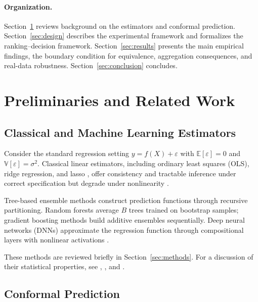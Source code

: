 \documentclass[pdflatex,sn-mathphys-ay]{sn-jnl}%
\theoremstyle{thmstyleone}%
\theoremstyle{thmstyletwo}%
\theoremstyle{thmstylethree}%
\begin{document}
\paragraph{Organization.}
Section~\ref{sec:prelim} reviews background on the estimators and conformal prediction. Section~\ref{sec:design} describes the experimental framework and formalizes the ranking--decision framework. Section~\ref{sec:results} presents the main empirical findings, the boundary condition for equivalence, aggregation consequences, and real-data robustness. Section~\ref{sec:conclusion} concludes.

\section{Preliminaries and Related Work}
\label{sec:prelim}

\subsection{Classical and Machine Learning Estimators}

Consider the standard regression setting $y = f(X) + \varepsilon$ with $\mathbb{E}[\varepsilon] = 0$ and $\mathbb{V}[\varepsilon] = \sigma^2$. Classical linear estimators, including ordinary least squares (OLS), ridge regression, and lasso \citep{tibshirani1996}, offer consistency and tractable inference under correct specification but degrade under nonlinearity \citep{lehmann2006}.

Tree-based ensemble methods construct prediction functions through recursive partitioning. Random forests \citep[RF;][]{breiman2001} average $B$ trees trained on bootstrap samples; gradient boosting methods \citep{chen2016, ke2017} build additive ensembles sequentially. Deep neural networks (DNNs) approximate the regression function through compositional layers with nonlinear activations \citep{goodfellow2016}.

These methods are reviewed briefly in Section~\ref{sec:methods}. For a discussion of their statistical properties, see \citet{scornet2015}, \citet{mentch2016}, and \citet{farrell2021}.

\subsection{Conformal Prediction}
\end{document}
